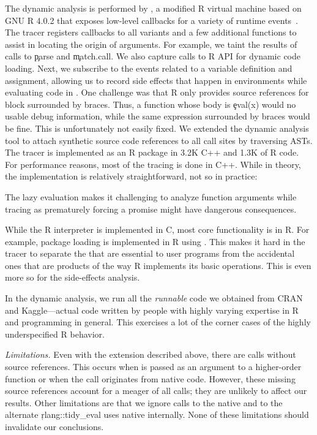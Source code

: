 \documentclass[review,screen,acmsmall]{acmart}
\newcommand{\mypara}[1]{\medskip\noindent\emph{#1}\xspace}
\begin{document}
The dynamic analysis is performed by \rdyntrace, a modified R virtual machine
based on GNU R 4.0.2 that exposes low-level callbacks for a variety of runtime
events~\cite{oopsla19b}. The tracer registers callbacks to all \eval variants
and a few additional functions to assist in locating the origin of \eval
arguments. For example, we taint the results of calls to \c{parse} and
\c{match.call}. We also capture calls to R API for dynamic code loading. Next,
we subscribe to the events related to a variable definition and assignment,
allowing us to record side effects that happen in environments while evaluating
code in \eval. One challenge was that R only provides source references for
block surrounded by braces. Thus, a function whose body is \c{eval(x)} would no
usable debug information, while the same expression surrounded by braces would
be fine. This is unfortunately not easily fixed. We extended the dynamic
analysis tool to attach synthetic source code references to all \eval call
sites by traversing ASTs. The tracer is implemented as an R package in 3.2K C++
and 1.3K of R code. For performance reasons, most of the tracing is done in
C++. While in theory, the implementation is relatively straightforward, not so
in practice:
%
\begin{compactitem}[---]

\item The lazy evaluation makes it challenging to analyze function arguments
  while tracing as prematurely forcing a promise might have dangerous
  consequences.

\item While the R interpreter is implemented in C, most core functionality is in
  R. For example, package loading is implemented in R using \eval. This makes it
  hard in the tracer to separate the \eval that are essential to user programs
  from the accidental ones that are products of the way R implements its basic
  operations. This is even more so for the side-effects analysis.

\item In the dynamic analysis, we run all the \emph{runnable} code we obtained
  from CRAN and Kaggle---\ie actual code written by people with highly varying
  expertise in R and programming in general. This exercises a lot of the corner
  cases of the highly underspecified R behavior.

\end{compactitem}


\mypara{Limitations.} Even with the extension described above, there are
\PkgUndefinedRnd \eval calls without source references. This occurs when \eval
is passed as an argument to a higher-order function or when the \eval call
originates from native code. However, these missing source references account
for a meager \PkgUndefinedRatio of all calls; they are unlikely to affect our
results. Other limitations are that we ignore calls to the native \eval and to
the alternate \c{rlang::tidy\_eval} uses native \eval internally. None of these
limitations should invalidate our conclusions.
\end{document}
